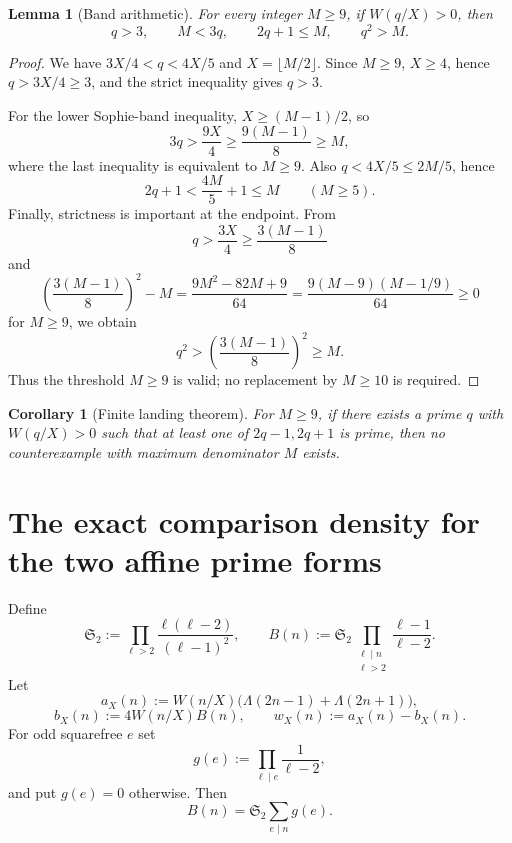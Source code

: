 \documentclass[11pt]{article}
\newtheorem{lemma}[theorem]{Lemma}
\newtheorem{corollary}[theorem]{Corollary}
\theoremstyle{definition}
\theoremstyle{remark}
\newcommand{\1}{\mathbf 1}
\begin{document}
\begin{lemma}[Band arithmetic]\label{lem:band}
For every integer $M\ge9$, if $W(q/X)>0$, then
\[
 \boxed{q>3,\qquad M<3q,\qquad 2q+1\le M,\qquad q^2>M.}
\]
\end{lemma}
\begin{proof}
We have $3X/4<q<4X/5$ and $X=\lfloor M/2\rfloor$.  Since $M\ge9$, $X\ge4$, hence
$q>3X/4\ge3$, and the strict inequality gives $q>3$.

For the lower Sophie-band inequality, $X\ge(M-1)/2$, so
\[
 3q>\frac{9X}{4}\ge\frac{9(M-1)}8\ge M,
\]
where the last inequality is equivalent to $M\ge9$.
Also $q<4X/5\le2M/5$, hence
\[
 2q+1<\frac{4M}{5}+1\le M\qquad(M\ge5).
\]
Finally, strictness is important at the endpoint.  From
\[
 q>\frac{3X}{4}\ge\frac{3(M-1)}8
\]
and
\[
 \left(\frac{3(M-1)}8\right)^2-M
 =\frac{9M^2-82M+9}{64}
 =\frac{9(M-9)(M-1/9)}{64}\ge0
\]
for $M\ge9$, we obtain
\[
 q^2>\left(\frac{3(M-1)}8\right)^2\ge M.
\]
Thus the threshold $M\ge9$ is valid; no replacement by $M\ge10$ is required.
\end{proof}

\begin{corollary}[Finite landing theorem]\label{cor:landing}
For $M\ge9$, if there exists a prime $q$ with $W(q/X)>0$ such that at least one of $2q-1,2q+1$ is prime,
then no counterexample with maximum denominator $M$ exists.
\end{corollary}

\section{The exact comparison density for the two affine prime forms}

Define
\[
 \mathfrak S_2:=\prod_{\ell>2}\frac{\ell(\ell-2)}{(\ell-1)^2},
 \qquad
 B(n):=\mathfrak S_2\prod_{\substack{\ell\mid n\\\ell>2}}\frac{\ell-1}{\ell-2}.
\]
Let
\[
 a_X(n):=W(n/X)\bigl(\Lambda(2n-1)+\Lambda(2n+1)\bigr),
\]
\[
 b_X(n):=4W(n/X)B(n),\qquad w_X(n):=a_X(n)-b_X(n).
\]
For odd squarefree $e$ set
\[
 g(e):=\prod_{\ell\mid e}\frac1{\ell-2},
\]
and put $g(e)=0$ otherwise.  Then
\[
 B(n)=\mathfrak S_2\sum_{e\mid n}g(e).
\tag{7.1}
\]
\end{document}
